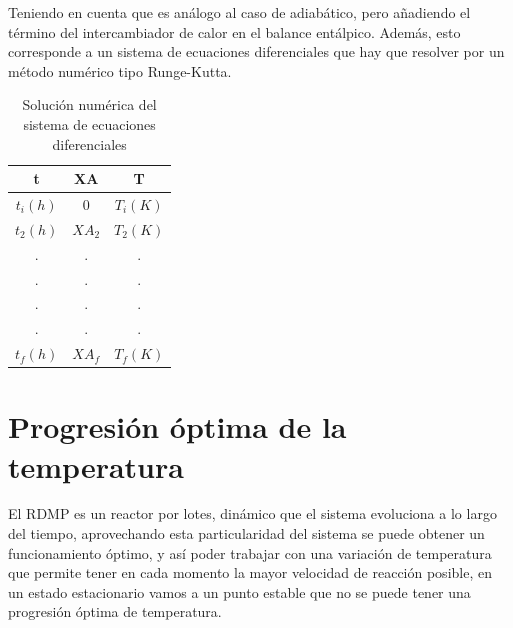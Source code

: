 \vspace{1em}
Teniendo en cuenta que es análogo al caso de adiabático, pero añadiendo el término del intercambiador de calor en el balance entálpico.
Además, esto corresponde a un sistema de ecuaciones diferenciales que hay que resolver por un método numérico tipo Runge-Kutta.\\
\vspace{1em}
\begin{table}[h]
    \centering
    \label{tab:solucion_numerica}
    \begin{tabular}{|c|c|c|}
        \hline
        \textbf{t} & \textbf{XA} & \textbf{T} \\
        \hline
        $t_i(h)$   & 0           & $T_i(K)$   \\
        $t_2(h)$   & $XA_2$      & $T_2(K)$   \\
        .          & .           & .          \\
        .          & .           & .          \\
        .          & .           & .          \\
        .          & .           & .          \\
        \hline
        $t_f(h)$   & $XA_f$      & $T_f(K)$   \\
        \hline
    \end{tabular}
    \caption{Solución numérica del sistema de ecuaciones diferenciales}
\end{table}
\section{Progresión óptima de la temperatura}
El RDMP es un reactor por lotes, dinámico que el sistema evoluciona a lo largo del tiempo, aprovechando esta particularidad del sistema se puede obtener un funcionamiento óptimo, y así poder trabajar con una variación de temperatura
que permite tener en cada momento la mayor velocidad de reacción posible, en un estado estacionario vamos a un punto estable que no se puede tener una progresión óptima de temperatura.


